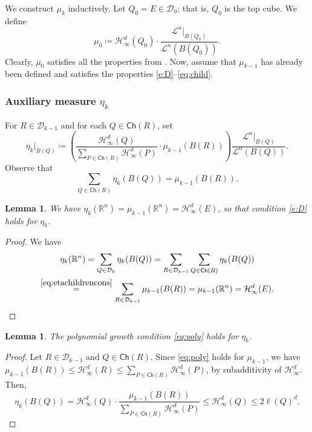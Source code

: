 \documentclass[11pt,reqno]{amsart}
\newtheorem{lemma}[theorem]{Lemma}
\theoremstyle{definition}
\theoremstyle{remark}
\numberwithin{equation}{section}
\newcommand{\R}{\mathbb{R}}
\newcommand{\hdc}{\mathcal{H}^d_\infty}
\newcommand{\dD}{\mathcal{D}}
\newcommand{\DD}{\mathcal{D}}
\newcommand{\Child}{\mathsf{Ch}}
\newcommand{\dL}{\mathcal{L}}
\theoremstyle{theorem}
\theoremstyle{definition}
\theoremstyle{remark}
\numberwithin{equation}{section}
\begin{document}
We construct $\mu_k$ inductively. Let $Q_0=E\in\DD_0$; that is, $Q_0$ is the top cube. We define
\begin{equation*}
	\mu_0\coloneqq \hdc(Q_0) \cdot \frac{\dL^n|_{B(Q_0)}}{\dL^n(B(Q_0))}.
\end{equation*} 
Clearly, $\mu_0$ satisfies all the properties from . Now, assume that $\mu_{k-1}$ has already been defined and satisfies the properties \eqref{e:D}--\eqref{eq:child}.
\subsubsection{Auxiliary measure $\eta_{k}$}
For $R \in \dD_{k-1}$ and for each $Q \in \Child(R)$, set 
\begin{equation}\label{e:def-mul}
	\eta_{k}|_{B(Q)}\coloneqq \left( \frac{\hdc(Q)}{\sum_{P \in \Child(R)} \hdc(P)} \cdot \mu_{k-1}(B(R)) \right) \frac{\dL^n|_{B(Q)}}{\dL^n(B(Q))}.
\end{equation} 
Observe that
\begin{equation}\label{eq:etachildrencons}
\sum_{Q\in\Child(R)} \eta_{k}(B(Q)) = \mu_{k-1}(B(R)).
\end{equation}

\begin{lemma}\label{l:M-mul}
	We have $\eta_k(\R^n)=\mu_{k-1}(\R^n)=\hdc(E)$, so that condition \eqref{e:D} holds for $\eta_k$.
\end{lemma}
\begin{proof}
	We have
	\begin{multline*}
		\eta_k(\R^n) = \sum_{Q \in \dD_k} \eta_k(B(Q)) = \sum_{R \in \dD_{k-1}} \sum_{Q \in \Child(R)} \eta_k(B(Q))\\
		\overset{\eqref{eq:etachildrencons}}{=} \sum_{R \in \dD_{k-1}} \mu_{k-1}(B(R))= \mu_{k-1}(\R^n) = \hdc(E).
	\end{multline*}
\end{proof}

\begin{lemma}\label{l:A-mul}
	The polynomial growth condition \eqref{eq:poly} holds for $\eta_k$.
\end{lemma}
\begin{proof}
	Let $R\in\DD_{k-1}$ and $Q\in\Child(R)$. Since \eqref{eq:poly} holds for $\mu_{k-1}$, we have $\mu_{k-1}(B(R)) \leq \hdc(R) \leq \sum_{P \in \Child(R)} \hdc(P)$, by subadditivity of $\hdc$. Then,
	\begin{equation}\label{e:A-mul}
		\eta_k(B(Q)) = \hdc(Q) \cdot \frac{\mu_{k-1} (B(R))}{\sum_{P \in \Child(R)} \hdc(P) } \leq \hdc(Q) \leq 2 \ell(Q)^d.
	\end{equation}
	
\end{proof}
\end{document}
